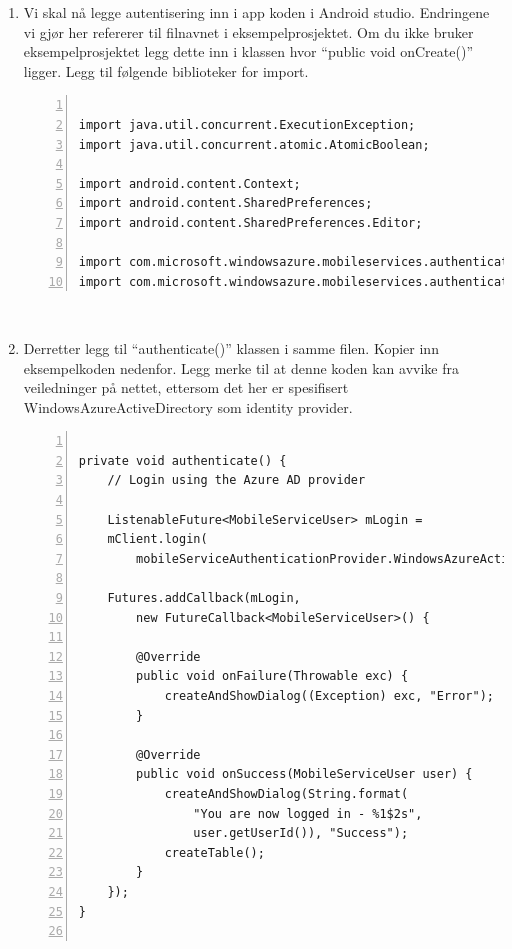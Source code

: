 \begin{enumerate}
\\
\item Vi skal nå legge autentisering inn i app koden i Android studio. Endringene vi gjør her refererer til filnavnet i eksempelprosjektet. Om du ikke bruker eksempelprosjektet legg dette inn i klassen hvor “public void onCreate()” ligger. 
Legg til følgende biblioteker for import.
\\
\begin{lstlisting}[numbers=left, captionpos=b,   caption={Eksempel som viser hvilke biblioteker som bør importeres.}, ]
    
import java.util.concurrent.ExecutionException;
import java.util.concurrent.atomic.AtomicBoolean;

import android.content.Context;
import android.content.SharedPreferences;
import android.content.SharedPreferences.Editor;

import com.microsoft.windowsazure.mobileservices.authentication.MobileServiceAuthenticationProvider;
import com.microsoft.windowsazure.mobileservices.authentication.MobileServiceUser;
\end{lstlisting}
\\
\item Derretter legg til “authenticate()” klassen i samme filen. Kopier inn eksempelkoden nedenfor. Legg merke til at denne koden kan avvike fra veiledninger på nettet, ettersom det her er spesifisert WindowsAzureActiveDirectory som identity provider. 
\\
\begin{lstlisting}[numbers=left, captionpos=b,   caption={Eksempel som viser hvordan authenticate klassen kan se ut.}, ]

private void authenticate() {
    // Login using the Azure AD provider

    ListenableFuture<MobileServiceUser> mLogin = 
    mClient.login(
        mobileServiceAuthenticationProvider.WindowsAzureActiveDirectory);
    
    Futures.addCallback(mLogin, 
        new FutureCallback<MobileServiceUser>() {
        
        @Override
        public void onFailure(Throwable exc) {         
            createAndShowDialog((Exception) exc, "Error");
        }           
        
        @Override
        public void onSuccess(MobileServiceUser user) {
            createAndShowDialog(String.format(
                "You are now logged in - %1$2s",
                user.getUserId()), "Success");
            createTable();  
        }
    });     
}


\end{lstlisting}
\end{enumerate}
